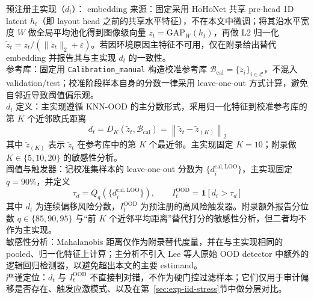 预注册主实现（$d_t$）：\label{sec:method-dt}
embedding 来源：固定采用 HoHoNet 共享 pre-head 1D latent $h_t$（即 layout head 之前的共享水平特征），不在本文中微调；将其沿水平宽度 $W$ 做全局平均池化得到图像级向量 $z_t=\mathrm{GAP}_{W}(h_t)$，再做 L2 归一化 $\tilde z_t=z_t/(\|z_t\|_2+\varepsilon)$。若因环境原因主特征不可用，仅在附录给出替代 embedding 并报告其与主实现 $d_t$ 的一致性。
\\ 参考库：固定用 \texttt{Calibration\_manual} 构造校准参考库 $\mathcal{B}_{\mathrm{cal}}=\{\tilde z_i\}_{i\in \mathcal{C}}$，不混入 validation/test；校准阶段样本自身的分数一律采用 leave-one-out 方式计算，避免自邻近导致阈值偏乐观。
\\ $d_t$ 定义：主实现遵循 KNN-OOD 的主分数形式，采用归一化特征到校准参考库的第 $K$ 个近邻欧氏距离
\[d_t = D_K\!\left(\tilde z_t,\mathcal{B}_{\mathrm{cal}}\right)=\left\|\tilde z_t-\tilde z_{(K)}\right\|_2\]
其中 $\tilde z_{(K)}$ 表示 $\tilde z_t$ 在参考库中的第 $K$ 个最近邻。主实现固定 $K=10$；附录做 $K\in\{5,10,20\}$ 的敏感性分析。
\\ 阈值与触发器：记校准集样本的 leave-one-out 分数为 $\{d_i^{\mathrm{cal,LOO}}\}$，主实现固定 $q=90\%$，并定义
\[\tau_d = Q_q\!\left(\{d_i^{\mathrm{cal,LOO}}\}\right),\qquad I_t^{\mathrm{OOD}}=\mathbf{1}[d_t>\tau_d]\]
其中 $d_t$ 为连续偏移风险分数，$I_t^{\mathrm{OOD}}$ 为预注册的高风险触发器。附录额外报告分位数 $q\in\{85,90,95\}$ 与“前 $K$ 个近邻平均距离”替代打分的敏感性分析，但二者均不作为主实现。
\\ 敏感性分析：Mahalanobis 距离仅作为附录替代度量，并在与主实现相同的 pooled、归一化特征上计算；主分析不引入 Lee 等人原始 OOD detector 中额外的逻辑回归检测器，以避免超出本文的主要 estimand。
\\ 严谨定位：$d_t$ 与 $I_t^{\mathrm{OOD}}$ 不直接判对错，不作为硬门控过滤样本；它们仅用于审计偏移是否存在、触发应激模式、以及在第~\ref{sec:exp-iid-stress}节中做分层对比。

